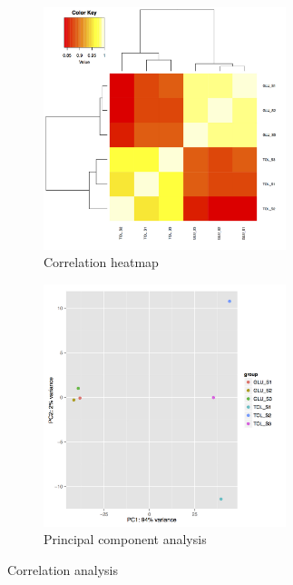 \documentclass[12pt, a4paper]{report}
\begin{document}
%
%

\begin{figure}[H]
	\centering
	\begin{subfigure}{0.4\textwidth}
		\includegraphics[width=200pt]{pics/heatmap2}
		\caption{Correlation heatmap} \label{fig:heatmap}
	\end{subfigure}
	\hspace*{1cm} 
	\begin{subfigure}{0.5\textwidth}
		\includegraphics[width=200pt]{pics/PCA}
		\caption{Principal component analysis} \label{fig:pca}
	\end{subfigure}
	\hspace*{\fill} %
	\caption{Correlation analysis} \label{fig:1}
\end{figure}
\end{document}
